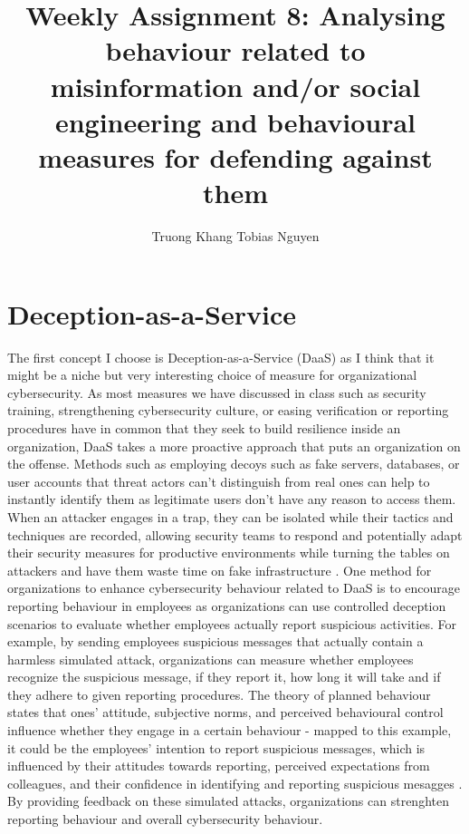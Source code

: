 \documentclass[12pt]{article}
\title{Weekly Assignment 8: Analysing behaviour related to misinformation and/or social engineering and behavioural measures for defending against them}
\author{Truong Khang Tobias Nguyen}
\date{}
\begin{document}
\maketitle

\section{Deception-as-a-Service}
The first concept I choose is Deception-as-a-Service (DaaS) as I think that it might be a niche but very interesting choice of measure for organizational cybersecurity. As most measures we have discussed in class such as security training, strengthening cybersecurity culture, or easing verification or reporting procedures have in common that they seek to build resilience inside an organization, DaaS takes a more proactive approach that puts an organization on the offense.
\newline
Methods such as employing decoys such as fake servers, databases, or user accounts that threat actors can't distinguish from real ones can help to instantly identify them as legitimate users don't have any reason to access them. When an attacker engages in a trap, they can be isolated while their tactics and techniques are recorded, allowing security teams to respond and potentially adapt their security measures for productive environments while turning the tables on attackers and have them waste time on fake infrastructure \cite{stoll1988stalking, acalvio2026deception}.
\newline
One method for organizations to enhance cybersecurity behaviour related to DaaS is to encourage reporting behaviour in employees as organizations can use controlled deception scenarios to evaluate whether employees actually report suspicious activities. For example, by sending employees suspicious messages that actually contain a harmless simulated attack, organizations can measure whether employees recognize the suspicious message, if they report it, how long it will take and if they adhere to given reporting procedures. The theory of planned behaviour states that ones' attitude, subjective norms, and perceived behavioural control influence whether they engage in a certain behaviour - mapped to this example, it could be the employees' intention to report suspicious messages, which is influenced by their attitudes towards reporting, perceived expectations from colleagues, and their confidence in identifying and reporting suspicious mesagges \cite{ajzen2011theory}. By providing feedback on these simulated attacks, organizations can strenghten reporting behaviour and overall cybersecurity behaviour.
\end{document}
